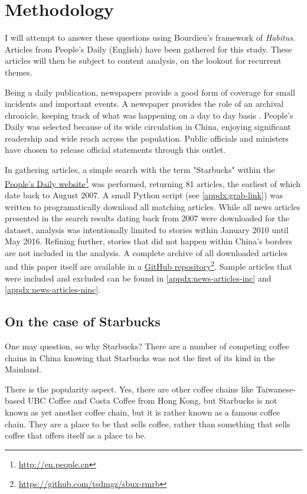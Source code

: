 \chapter{Methodology}\label{chap:methodology}

I will attempt to answer these questions using Bourdieu's framework of
\emph{Habitus}. Articles from People's Daily (English) have been gathered for
this study. These articles will then be subject to content analysis, on the
lookout for recurrent themes.

Being a daily publication, newspapers provide a good form of coverage for small
incidents and important events. A newspaper provides the role of an archival
chronicle, keeping track of what was happening on a day to day basis
\autocite{martin_examining_1996}. People's Daily was selected because of its
wide circulation in China, enjoying significant readership and wide reach across
the population. Public officials and ministers have chosen to release official
statements through this outlet.

In gathering articles, a simple search with the term "Starbucks" within the
\href{http://en.people.cn}{People's Daily
website}\footnote{\url{http://en.people.cn}} was performed, returning 81
articles, the earliest of which date back to August 2007. A small Python script
(see \autoref{appdx:grab-link}) was written to programatically download
all matching articles. While all news articles presented in the search results
dating back from 2007 were downloaded for the dataset, analysis was
intentionally limited to stories within January 2010 until May 2016. Refining
further, stories that did not happen within China's borders are not included in
the analysis. A complete archive of all downloaded articles and this paper
itself are available in a \href{https://github.com/tsdmgz/sbux-rmrb}{GitHub
repository}\footnote{\url{https://github.com/tsdmgz/sbux-rmrb}}. Sample articles
that were included and excluded can be found in
\ref{appdx:news-articles-inc} and \ref{appdx:news-articles-ninc}.

\section{On the case of Starbucks}\label{sec:case-of-sbux}

One may question, so why Starbucks? There are a number of competing coffee
chains in China knowing that Starbucks was not the first of its kind in the
Mainland.

There is the popularity aspect. Yes, there are other coffee chains like
Taiwanese-based UBC Coffee and Costa Coffee from Hong Kong, but Starbucks is not
known as yet another coffee chain, but it is rather known as a famous coffee
chain. They are a place to be that sells coffee, rather than something that
sells coffee that offers itself as a place to be.


